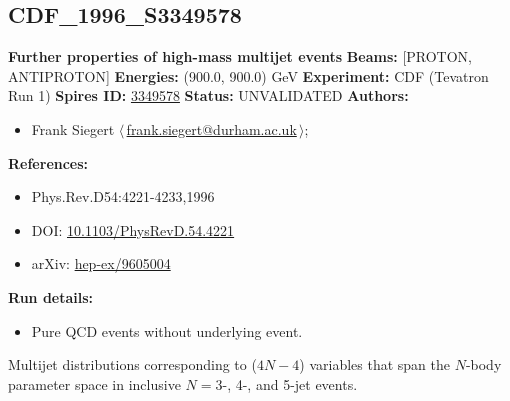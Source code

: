\subsection[CDF\_1996\_S3349578]{CDF\_1996\_S3349578\,\cite{Abe:1996nn}}
\textbf{Further properties of high-mass multijet events}\newline
\textbf{Beams:} [PROTON, ANTIPROTON] \newline
\textbf{Energies:} (900.0, 900.0) GeV \newline
\textbf{Experiment:} CDF (Tevatron Run 1) \newline
\textbf{Spires ID:} \href{http://www.slac.stanford.edu/spires/find/hep/www?rawcmd=key+3349578}{3349578}\newline
\textbf{Status:} UNVALIDATED\newline
\textbf{Authors:}
\begin{itemize}
  \item Frank Siegert $\langle\,$\href{mailto:frank.siegert@durham.ac.uk}{frank.siegert@durham.ac.uk}$\,\rangle$;
\end{itemize}
\textbf{References:}
\begin{itemize}
  \item Phys.Rev.D54:4221-4233,1996
  \item DOI: \href{http://dx.doi.org/10.1103/PhysRevD.54.4221}{10.1103/PhysRevD.54.4221}
  \item arXiv: \href{http://arxiv.org/abs/hep-ex/9605004}{hep-ex/9605004}
\end{itemize}
\textbf{Run details:}
\begin{itemize}

  \item Pure QCD events without underlying event.\end{itemize}

\noindent Multijet distributions corresponding to ($4N-4$) variables that span the $N$-body parameter space in inclusive $N = 3$-, 4-, and 5-jet events.

\clearpage


\clearpage

